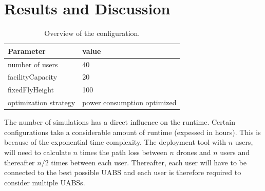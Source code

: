 \chapter{Results and Discussion}
\label{chap:results}
\iffalse %
\begin{table}[!htb]
\centering
  \begin{tabular}{|l|l|}
  \hline
  Parameter               & value          \\   \hline 
  number of users               & 40            \\ 
  facilityCapacity                    & 20           \\ 
  fixedFlyHeight               & 100           \\ 
  optimization strategy               & power consumption optimized           \\ 
  \hline
  \end{tabular}
  \caption{Overview of the configuration.}
  \label{table:confOverviewScenario2}
\end{table}

The number of simulations has a direct influence on the runtime. Certain configurations take a considerable amount of runtime (expessed in hours). This is because of the
exponential time complexity. The deployment tool with $n$ users, will need to calculate $n$ times the path loss between $n$ drones and $n$ users and thereafter $n/2$ times between
each user. Thereafter, each user will have to be connected to the best possible \gls{UABS} and each user is therefore required to consider multiple \gls{UABS}s.

